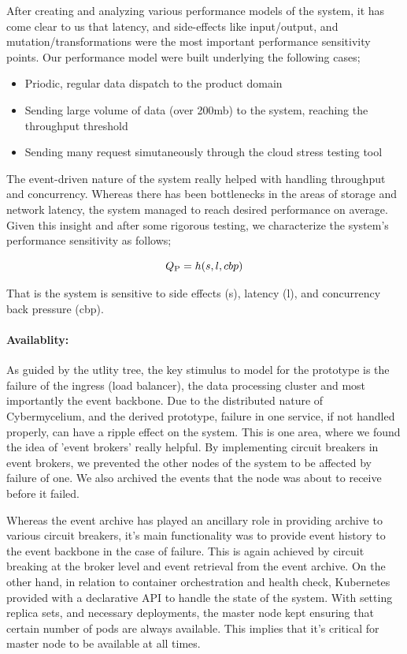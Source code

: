 \documentclass{bmcart}
\begin{document}
After creating and analyzing various performance models of the system, it has come clear to us that latency, and side-effects like input/output, and mutation/transformations were the most important performance sensitivity points. Our performance model were built underlying the following cases;

\begin{itemize}
    \item Priodic, regular data dispatch to the product domain
    \item Sending large volume of data (over 200mb) to the system, reaching the throughput threshold
    \item Sending many request simutaneously through the cloud stress testing tool
\end{itemize}

The event-driven nature of the system really helped with handling throughput and concurrency. Whereas there has been bottlenecks in the areas of storage and network latency, the system managed to reach desired performance on average. Given this insight and after some rigorous testing, we characterize the system's performance sensitivity as follows;

\begin{equation}
    Q\textsubscript{P} = h(s, l, cbp)
\end{equation}

That is the system is sensitive to side effects (s), latency (l), and concurrency back pressure (cbp).

\paragraph{Availablity:}

As guided by the utlity tree, the key stimulus to model for the prototype is the failure of the ingress (load balancer), the data processing cluster and most importantly the event backbone. Due to the distributed nature of Cybermycelium, and the derived prototype, failure in one service, if not handled properly, can have a ripple effect on the system. This is one area, where we found the idea of 'event brokers' really helpful. By implementing circuit breakers in event brokers, we prevented the other nodes of the system to be affected by failure of one. We also archived the events that the node was about to receive before it failed.

Whereas the event archive has played an ancillary role in providing archive to various circuit breakers, it's main functionality was to provide event history to the event backbone in the case of failure. This is again achieved by circuit breaking at the broker level and event retrieval from the event archive. On the other hand, in relation to container orchestration and health check, Kubernetes provided with a declarative API to handle the state of the system. With setting replica sets, and necessary deployments, the master node kept ensuring that certain number of pods are always available. This implies that it's critical for master node to be available at all times.
\end{document}
